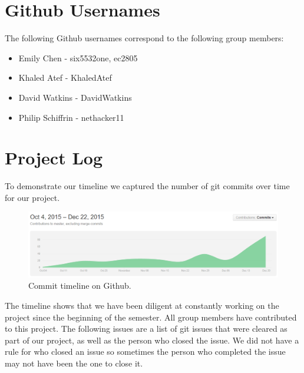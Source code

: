 \begin{homeworkProblem}
	\section{Github Usernames}
	The following Github usernames correspond to the following group members:
	\begin{itemize}
		\item Emily Chen - six5532one, ec2805
		\item Khaled Atef - KhaledAtef
		\item David Watkins - DavidWatkins
		\item Philip Schiffrin - nethacker11
	\end{itemize}
 
	\section{Project Log}
	To demonstrate our timeline we captured the number of git commits over time for our project. 
	
	\begin{figure}[!ht]
		\centering
		\includegraphics[width=5.5in]{Includes/timeline}
		\caption{Commit timeline on Github.}
	\end{figure}
	\pagebreak
	The timeline shows that we have been diligent at constantly working on the project since the beginning of the semester. All group members have contributed to this project. The following issues are a list of git issues that were cleared as part of our project, as well as the person who closed the issue. We did not have a rule for who closed an issue so sometimes the person who completed the issue may not have been the one to close it. 
	

\end{homeworkProblem}
